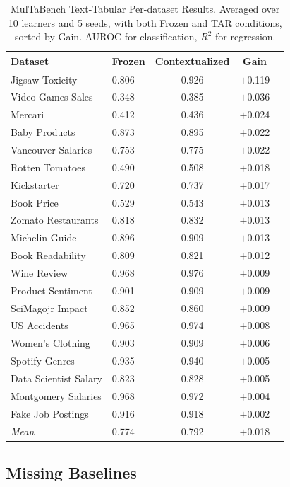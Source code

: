 \begin{table}[ht]
\centering
\caption{MulTaBench Text-Tabular Per-dataset Results. Averaged over 10 learners and 5 seeds, with both Frozen and TAR conditions, sorted by Gain. AUROC for classification, $R^2$ for regression.}
\label{tab:app_results_text}
\small
\begin{tabular}{llccc}
\toprule
Dataset & Frozen & Contextualized & Gain \\
\midrule
Jigsaw Toxicity & 0.806 & 0.926 & $+$0.119 \\
Video Games Sales & 0.348 & 0.385 & $+$0.036 \\
Mercari & 0.412 & 0.436 & $+$0.024 \\
Baby Products & 0.873 & 0.895 & $+$0.022 \\
Vancouver Salaries & 0.753 & 0.775 & $+$0.022 \\
Rotten Tomatoes & 0.490 & 0.508 & $+$0.018 \\
Kickstarter & 0.720 & 0.737 & $+$0.017 \\
Book Price & 0.529 & 0.543 & $+$0.013 \\
Zomato Restaurants & 0.818 & 0.832 & $+$0.013 \\
Michelin Guide & 0.896 & 0.909 & $+$0.013 \\
Book Readability & 0.809 & 0.821 & $+$0.012 \\
Wine Review & 0.968 & 0.976 & $+$0.009 \\
Product Sentiment & 0.901 & 0.909 & $+$0.009 \\
SciMagojr Impact & 0.852 & 0.860 & $+$0.009 \\
US Accidents & 0.965 & 0.974 & $+$0.008 \\
Women's Clothing & 0.903 & 0.909 & $+$0.006 \\
Spotify Genres & 0.935 & 0.940 & $+$0.005 \\
Data Scientist Salary & 0.823 & 0.828 & $+$0.005 \\
Montgomery Salaries & 0.968 & 0.972 & $+$0.004 \\
Fake Job Postings & 0.916 & 0.918 & $+$0.002 \\
\midrule
\textit{Mean} & 0.774 & 0.792 & $+$0.018 \\
\bottomrule
\end{tabular}
\end{table}

\subsection{Missing Baselines}

